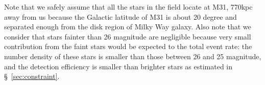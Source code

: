 \documentclass[iop, apj]{emulateapj}
\newcommand{\?}{\stackrel{?}{=}}
\begin{document}
Note that we safely assume that all the stars in the field 
locate at M31, 770kpc away from us 
because the Galactic latitude of M31 is about 20 degree and 
separated enough from the disk region of Milky Way galaxy. 
Also note that we consider that stars fainter than 26 magnitude are negligible 
because very small contribution from the faint stars would be expected to the total event rate:  
the number density of these stars is smaller than those between 26 and 25 magnitude, and 
the detection efficiency is smaller than brighter stars as estimated in \S~\ref{sec:constraint}. 



\end{document}
